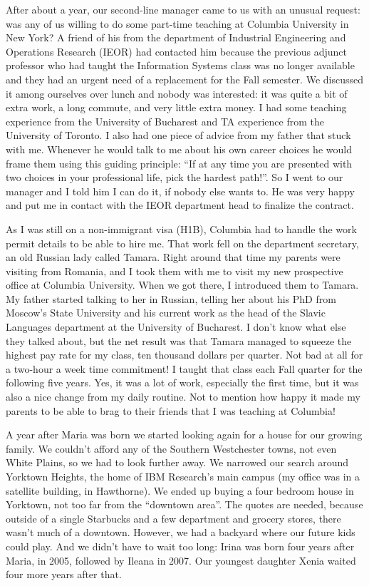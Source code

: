 \documentclass[12pt]{book}
\begin{document}
After about a year, our second-line manager came to us with an unusual
request: was any of us willing to do some part-time teaching at Columbia
University in New York? A friend of his from the department of
Industrial Engineering and Operations Research (IEOR) had contacted him
because the previous adjunct professor who had taught the Information
Systems class was no longer available and they had an urgent need of a
replacement for the Fall semester. We discussed it among ourselves over
lunch and nobody was interested: it was quite a bit of extra work, a
long commute, and very little extra money. I had some teaching
experience from the University of Bucharest and TA experience from the
University of Toronto. I also had one piece of advice from my father
that stuck with me. Whenever he would talk to me about his own career
choices he would frame them using this guiding principle: ``If at any
time you are presented with two choices in your professional life, pick
the hardest path!''. So I went to our manager and I told him I can do
it, if nobody else wants to. He was very happy and put me in contact
with the IEOR department head to finalize the contract.

As I was still on a non-immigrant visa (H1B), Columbia had to handle the
work permit details to be able to hire me. That work fell on the
department secretary, an old Russian lady called Tamara. Right around
that time my parents were visiting from Romania, and I took them with me
to visit my new prospective office at Columbia University. When we got
there, I introduced them to Tamara. My father started talking to her in
Russian, telling her about his PhD from Moscow's State University and
his current work as the head of the Slavic Languages department at the
University of Bucharest. I don't know what else they talked about, but
the net result was that Tamara managed to squeeze the highest pay rate
for my class, ten thousand dollars per quarter. Not bad at all for a
two-hour a week time commitment! I taught that class each Fall quarter
for the following five years. Yes, it was a lot of work, especially the
first time, but it was also a nice change from my daily routine. Not to
mention how happy it made my parents to be able to brag to their friends
that I was teaching at Columbia!

A year after Maria was born we started looking again for a house for our
growing family. We couldn't afford any of the Southern Westchester
towns, not even White Plains, so we had to look further away. We
narrowed our search around Yorktown Heights, the home of IBM Research's
main campus (my office was in a satellite building, in Hawthorne). We
ended up buying a four bedroom house in Yorktown, not too far from the
``downtown area''. The quotes are needed, because outside of a single
Starbucks and a few department and grocery stores, there wasn't much of
a downtown. However, we had a backyard where our future kids could play.
And we didn't have to wait too long: Irina was born four years after
Maria, in 2005, followed by Ileana in 2007. Our youngest daughter Xenia
waited four more years after that.
\end{document}
